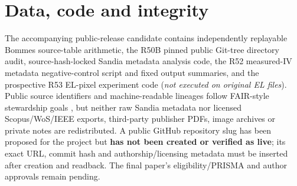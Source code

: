 \documentclass[10pt,a4paper]{article}
\begin{document}
\section*{Data, code and integrity}
The accompanying public-release candidate contains independently replayable Bommes source-table arithmetic, the R50B pinned public Git-tree directory audit, source-hash-locked Sandia metadata analysis code, the R52 measured-IV metadata negative-control script and fixed output summaries, and the prospective R53 EL-pixel experiment code (\emph{not executed on original EL files}). Public source identifiers and machine-readable lineages follow FAIR-style stewardship goals \cite{wilkinson2016}, but neither raw Sandia metadata nor licensed Scopus/WoS/IEEE exports, third-party publisher PDFs, image archives or private notes are redistributed. A public GitHub repository slug has been proposed for the project but \textbf{has not been created or verified as live}; its exact URL, commit hash and authorship/licensing metadata must be inserted after creation and readback. The final paper's eligibility/PRISMA and author approvals remain pending.
\end{document}
